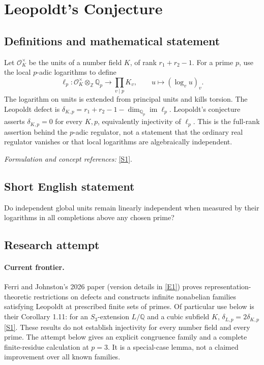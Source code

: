 \documentclass[11pt,a4paper]{article}
\newcommand{\Z}{\mathbb{Z}}
\newcommand{\Q}{\mathbb{Q}}
\newcommand{\sref}[2]{\hyperlink{source:#1:#2}{[S#2]}}
\newcommand{\eref}[2]{\hyperlink{extra:#1:#2}{[E#2]}}
\newif\ifshowcatalogue
\newcommand{\cataloguescope}[1]{\ifshowcatalogue
 \paragraph{Exact scope in the supplied catalogue.}
 \begin{quote}\small #1\end{quote}\fi}
\numberwithin{equation}{section}
\begin{document}
\setcounter{section}{0}
\clearpage
\section*{\texorpdfstring{Leopoldt's Conjecture}{Leopoldt's Conjecture}}\label{1273}
\subsection{Definitions and mathematical statement}
Let $\mathcal O_K^\times$ be the units of a number field $K$, of rank $r_1+r_2-1$. For a prime $p$, use the local $p$-adic logarithms to define
\[
 \ell_p:\mathcal O_K^\times\otimes_{\Z}\Q_p\longrightarrow\prod_{v\mid p}K_v,
 \qquad u\longmapsto(\log_v u)_v.
\]
The logarithm on units is extended from principal units and kills torsion. The Leopoldt defect is
$\delta_{K,p}=r_1+r_2-1-\dim_{\Q_p}\operatorname{im}\ell_p$.
Leopoldt's conjecture asserts $\delta_{K,p}=0$ for every $K,p$, equivalently injectivity of $\ell_p$. This is the full-rank assertion behind the $p$-adic regulator, not a statement that the ordinary real regulator vanishes or that local logarithms are algebraically independent.
\par\smallskip\textit{Formulation and concept references:} \sref{1273}{1}.
\cataloguescope{Prove or disprove that for every number field K and every prime p, the Leopoldt defect of K at p is zero, equivalently that the p-adic regulator has the conjectured full rank.}
\subsection{Short English statement}
Do independent global units remain linearly independent when measured by their logarithms in all completions above any chosen prime?
\subsection{Research attempt}

\paragraph{Current frontier.}
Ferri and Johnston's 2026 paper (version details in \eref{1273}{1}) proves representation-theoretic restrictions
on defects and constructs infinite nonabelian families satisfying Leopoldt
at prescribed finite sets of primes. Of particular use below is their
Corollary 1.11: for an $S_3$-extension $L/\Q$ and a cubic subfield $K$,
$\delta_{L,p}=2\delta_{K,p}$ \sref{1273}{1}. These results do not establish
injectivity for every number field and every prime. The attempt below gives
an explicit congruence family and a complete finite-residue calculation at
$p=3$. It is a special-case lemma, not a claimed improvement over all known
families.
\end{document}
